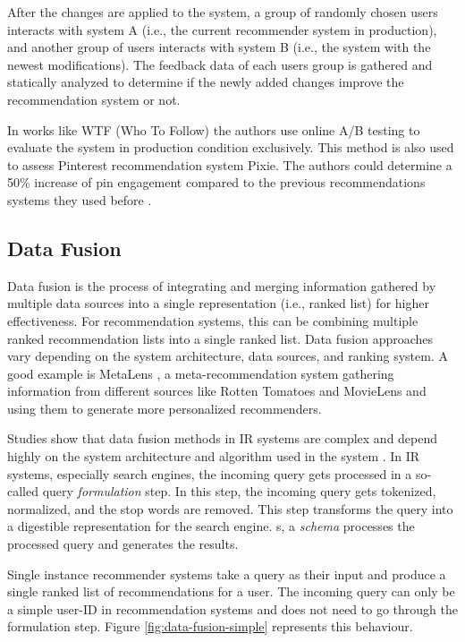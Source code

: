 After the changes are applied to the system, a group of randomly chosen users interacts with system A (i.e., the current recommender system in production), and another group of users interacts with system B (i.e., the system with the newest modifications). The feedback data of each users group is gathered and statically analyzed to determine if the newly added changes improve the recommendation system or not.

In works like WTF (Who To Follow) \cite{guptaWTFWhoFollow2013} the authors use online A/B testing to evaluate the system in production condition exclusively. This method is also used to assess Pinterest recommendation system Pixie. The authors could determine a 50\% increase of pin engagement compared to the previous recommendations systems they used before \cite{eksombatchaiPixieSystemRecommending2018}.


\subsection{Data Fusion}
\label{subsec:data-fusion}
Data fusion is the process of integrating and merging information gathered by multiple data sources into a single representation (i.e., ranked list) for higher effectiveness. For recommendation systems, this can be combining multiple ranked recommendation lists into a single ranked list. Data fusion approaches vary depending on the system architecture, data sources, and ranking system. A good example is MetaLens \cite{schaferMetarecommendationSystemsUsercontrolled2002}, a meta-recommendation system gathering information from different sources like Rotten Tomatoes and MovieLens and using them to generate more personalized recommenders.


Studies show that data fusion methods in IR systems are complex and depend highly on the system architecture and algorithm used in the system \cite{frankhsuComparingRankScore2005}. In IR systems, especially search engines, the incoming query gets processed in a so-called query \emph{formulation} step. In this step, the incoming query gets tokenized, normalized,  and the stop words are removed. This step transforms the query into a digestible representation for the search engine. s, a \emph{schema} processes the processed query and generates the results. 


Single instance recommender systems take a query as their input and produce a single ranked list of recommendations for a user. The incoming query can only be a simple user-ID in recommendation systems and does not need to go through the formulation step. Figure \ref{fig:data-fusion-simple} represents this behaviour.


